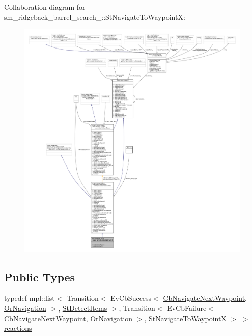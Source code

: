 Collaboration diagram for sm\+\_\+ridgeback\+\_\+barrel\+\_\+search\+\_\+:\+:St\+Navigate\+To\+WaypointX\+:
\nopagebreak
\begin{figure}[H]
\begin{center}
\leavevmode
\includegraphics[width=350pt]{structsm__ridgeback__barrel__search__2_1_1StNavigateToWaypointX__coll__graph}
\end{center}
\end{figure}
\subsection*{Public Types}
\begin{DoxyCompactItemize}
\item 
typedef mpl\+::list$<$ Transition$<$ Ev\+Cb\+Success$<$ \hyperlink{classcl__move__base__z_1_1CbNavigateNextWaypoint}{Cb\+Navigate\+Next\+Waypoint}, \hyperlink{classsm__ridgeback__barrel__search__2_1_1OrNavigation}{Or\+Navigation} $>$, \hyperlink{structsm__ridgeback__barrel__search__2_1_1StDetectItems}{St\+Detect\+Items} $>$, Transition$<$ Ev\+Cb\+Failure$<$ \hyperlink{classcl__move__base__z_1_1CbNavigateNextWaypoint}{Cb\+Navigate\+Next\+Waypoint}, \hyperlink{classsm__ridgeback__barrel__search__2_1_1OrNavigation}{Or\+Navigation} $>$, \hyperlink{structsm__ridgeback__barrel__search__2_1_1StNavigateToWaypointX}{St\+Navigate\+To\+WaypointX} $>$ $>$ \hyperlink{structsm__ridgeback__barrel__search__2_1_1StNavigateToWaypointX_a86050d2412d530bb19ad0042a20235dc}{reactions}
\end{DoxyCompactItemize}
